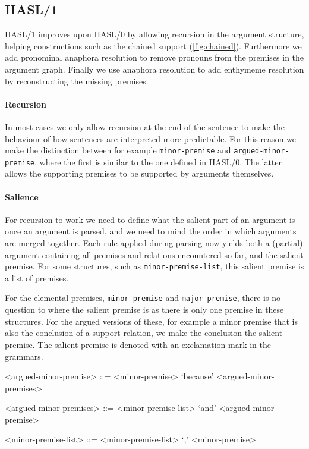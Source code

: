 \subsection{HASL/1}
HASL/1 improves upon HASL/0 by allowing recursion in the argument structure, helping constructions such as the chained support (\autoref{fig:chained}). Furthermore we add pronominal anaphora resolution to remove pronouns from the premises in the argument graph. Finally we use anaphora resolution to add enthymeme resolution by reconstructing the missing premises.

\paragraph{Recursion}
In most cases we only allow recursion at the end of the sentence to make the behaviour of how sentences are interpreted more predictable. For this reason we make the distinction between for example \texttt{minor-premise} and \texttt{argued-minor-premise}, where the first is similar to the one defined in HASL/0. The latter allows the supporting premises to be supported by arguments themselves.

\paragraph{Salience}
For recursion to work we need to define what the salient part of an argument is once an argument is parsed, and we need to mind the order in which arguments are merged together. Each rule applied during parsing now yields both a (partial) argument containing all premises and relations encountered so far, and the salient premise. For some structures, such as \texttt{minor-premise-list}, this salient premise is a list of premises.

For the elemental premises, \texttt{minor-premise} and \texttt{major-premise}, there is no question to where the salient premise is as there is only one premise in these structures. For the argued versions of these, for example a minor premise that is also the conclusion of a support relation, we make the conclusion the salient premise. The salient premise is denoted with an exclamation mark in the grammars.

\begin{grammar}
<argued-minor-premise> ::= <minor-premise> `because' <argued-minor-premises> %

<argued-minor-premises> ::= <minor-premise-list> `and' <argued-minor-premise>

<minor-premise-list> ::= <minor-premise-list> `,' <minor-premise>
\end{grammar}

